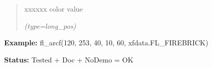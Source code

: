 \begin{boxedminipage}{\funcwidth}
\begin{quote}
\begin{Ventry}{xxxxxx}
          color value

            {\it (type=long\_pos)}

        \end{Ventry}

      \end{quote}

\textbf{Example:} fl\_arcf(120, 253, 40, 10, 60, xfdata.FL\_FIREBRICK)



\textbf{Status:} Tested + Doc + NoDemo = OK



    \end{boxedminipage}

    \label{xformslib:flxbasic:fl_arc}

    \vspace{0.5ex}

